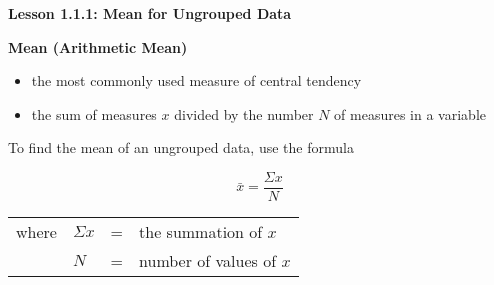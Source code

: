 \begin{center}
\textbf{Lesson 1.1.1: Mean for Ungrouped Data}
\end{center}

\vspace*{1ex}

\textbf{Mean (Arithmetic Mean)}
\begin{itemize} 
\item the most commonly used measure of central tendency

\item the sum of measures $x$ divided by the number $N$ of measures in a variable
\end{itemize}  

To find the mean of an ungrouped data, use the formula

\vspace*{-1.8ex} 
\[
\bar{x} = \displaystyle \frac{\Sigma x}{N} 
\] 
\vspace*{-2ex} 

\begin{tabular}{llcl}

where & $\Sigma x$ & = & the summation of $x$ \\

& $N$ & = & number of values of $x$ \\

\end{tabular} 
  
 

